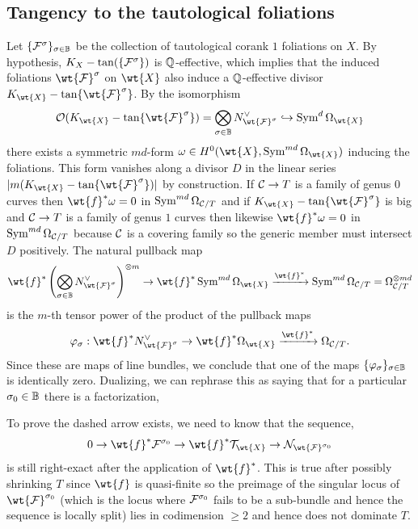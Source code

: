 \documentclass[main.tex]{subfiles}
\begin{document}
{\subsection{Tangency to the tautological foliations}

Let $\{ \mathcal{F}^{\sigma} \}_{\sigma \in \mathbb{B}}$ be the collection of tautological corank $1$ foliations on $X$. By hypothesis, $K_X - \tan( \{ \mathcal{F}^{\sigma} \})$ is $\mathbb{Q}$-effective, which implies that the induced foliations $\wt{\F}^{\sigma}$ on $\wt{X}$ also induce a $\mathbb{Q}$-effective divisor $K_{\wt{X}} - \tan \{ \wt{\F}^{\sigma} \}$. By the isomorphism
\[ \cO(K_{\wt{X}} - \tan \{ \wt{\F}^{\sigma} \}) = \bigotimes_{\sigma \in \BB} N^{\vee}_{\wt{\F}^{\sigma}} \embed \Sym^{d} \Omega_{\wt{X}} \]
there exists a symmetric $md$-form $\omega \in H^0(\wt{X}, \Sym^{md} \Omega_{\wt{X}})$ inducing the foliations. This form vanishes along a divisor $D$ in the linear series $| m(K_{\wt{X}} - \tan \{ \wt{\F}^{\sigma} \}) |$ by construction. If $\mathcal{C} \to T$ is a family of genus $0$ curves then $\wt{f}^* \omega = 0$ in $\operatorname{\mathrm{Sym}}^{md} \Omega_{\mathcal{C}/T}$ and if $K_{\wt{X}} - \tan \{ \wt{\F}^{\sigma} \}$ is big and $\mathcal{C} \to T$ is a family of genus $1$ curves then likewise $\wt{f}^* \omega = 0$ in $\operatorname{\mathrm{Sym}}^{md} \Omega_{\mathcal{C}/T}$ because $\mathcal{C}$ is a covering family so the generic member must intersect $D$ positively. The natural pullback map
\[ \wt{f}^* \left( \bigotimes_{\sigma \in \BB} N^{\vee}_{\wt{\F}^{\sigma}} \right)^{\ot m} \to \wt{f}^* \Sym^{md} \Omega_{\wt{X}} \xrightarrow{\wt{f}^*} \Sym^{md} \Omega_{\cC/T} = \Omega_{\cC/T}^{\ot md} \]
is the $m$-th tensor power of the product of the pullback maps 
\[ \varphi_{\sigma} : \wt{f}^* N^{\vee}_{\wt{\F}^{\sigma}} \to \wt{f}^* \Omega_{\wt{X}} \xrightarrow{\wt{f}^*}  \Omega_{\cC/T}. \]
Since these are maps of line bundles, we conclude that one of the maps $\{ \varphi_{\sigma} \}_{\sigma \in \mathbb{B}}$ is identically zero. Dualizing, we can rephrase this as saying that for a particular $\sigma_0 \in \mathbb{B}$ there is a factorization,
\begin{center}
\end{center} 
To prove the dashed arrow exists, we need to know that the sequence,
\[ 0 \to \wt{f}^* \F^{\sigma_0} \to \wt{f}^* \cT_{\wt{X}} \to \cN_{\wt{\F}^{\sigma_0}} \]
is still right-exact after the application of $\wt{f}^*$. This is true after possibly shrinking $T$ since $\wt{f}$ is quasi-finite so the preimage of the singular locus of $\wt{\F}^{\sigma_0}$ (which is the locus where $\mathcal{F}^{\sigma_0}$ fails to be a sub-bundle and hence the sequence is locally split) lies in codimension $\ge 2$ and hence does not dominate $T$. 

}
\end{document}
